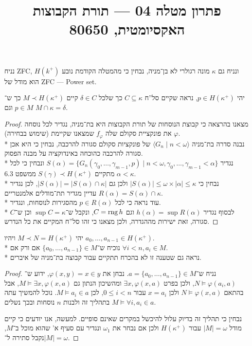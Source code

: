 
\title{פתרון מטלה 04 --- תורת הקבוצות האקסיומטית, 80650}

\DeclareMathOperator{\trcl}{trcl}
\DeclareMathOperator{\rank}{rank}


\maketitle
\maketitleprint{}

\question{}
נניח ZFC, ונניח גם $\kappa$ מונה רגולרי לא בן־מניה, נבחין כי מהמטלה הקודמת נובע $H(k^+)$ הוא מודל של ZFC --- Power set.

יהי $p \in H(\kappa^+)$, נראה שקיים סל''ח $C \subseteq \kappa$ כך שלכל $\delta \in C$ קיים $M \prec H(\kappa^+)$ כך ש־$p \in M$ וגם $M \cap \kappa = \delta$.
\begin{proof}
	מצאנו בהרצאה כי קבוצת הנוסחות של תורת הקבוצות היא בת־מניה, נגדיר לכל נוסחה $\varphi$ את פונקציית סקולם שלה $f_\varphi$ שמצאנו שקיימת (שימוש בבחירה). \\*
	נבנה סדרה בת־מניה $\langle G_n \mid n < \omega \rangle$ של פונקציות סקולם סגורה להרכבה, נבחין כי היא אכן סגורה להרכבה כהוכחה באינדוקציה על מבנה הפסוק. \\*
	נגדיר $S(\alpha) = \{G_n(\gamma_0, \dots, \gamma_{m - 1}, p) \mid n < \omega, \gamma_0, \dots, \gamma_{m - 1} < \alpha\}$ ונבחין כי לכל $\alpha < \kappa$ מתקיים $S(\gamma) \prec H(\kappa^+)$ ממשפט 6.3. \\*
	נבחין כי $|S(\alpha)| \le \omega \times |\alpha| \le \kappa$ ולכן גם $|S(\alpha)| = |S(\alpha) \cap \kappa|$, לכן נגדיר $R(\alpha) = S(\alpha) \cap \kappa$ עדיין מגדיר תת־מודלים אלמנטריים. \\*
	עוד נראה כי לכל $p \in R(\alpha)$ מהסגירות לנוסחות, ונגדיר. \\*
	לבסוף נגדיר $h(\alpha) = \sup R(\alpha)$ וגם $C = \operatorname{rng} h$, ונקבל ש־$\sup C = \kappa$ וכן ש־$C$ סגורה, זאת ישירות מההגדרה, ולכן מצאנו כי זהו סל''ח המקיים את כל הנדרש.
\end{proof}

\question{}
יהי $M \prec N = H(\kappa^+)$ ויהיו $a_0, \dots, a_{n - 1} \in H(\kappa^+)$. \\*
נוכיח ש־$\{a_0, \dots, a_{n - 1}\} \in M$ אם ורק אם $\forall i < n, a_i \in M$. \\*
נראה גם שטענה זו לא בהכרח תתקיים עבור קבוצה בת־מניה של איברים.
\begin{proof}
	נניח ש־$a = \{a_0, \dots, a_{n - 1}\} \in M$.
	נבחן את $\varphi(x, y) = x \in y$, ידוע ש־$N \models \varphi(a_i, a)$, ולכן בפרט $\exists x, \varphi(x, a)$ ומהשיכון הנתון גם $M \models \exists x, \varphi(x, a)$,
	אבל בהתאם $N \models \varphi(x, a)$ ולכן $x = a_i$ עבור $0 \le i < n$, לכן $M \models a_i \in a$. נוכל להמשיך עתה בתהליך זה ולבנות $n$ נוסחות ובכך נשלים $M \models \forall i, a_i \in a$.

	נבחין כי תהליך זה בדיוק עלול להיכשל במקרים שאינם סופיים.
	למעשה, אנו יודעים כי קיים מודל $|M| = \omega$ עבור $H(\kappa^+)$ ולכן אם נבחר את $\omega_1$ ונגדיר עם סעיף א' שהוא מוכל ב־$M$, נקבל סתירה ל־$|M| = \omega$.
\end{proof}

